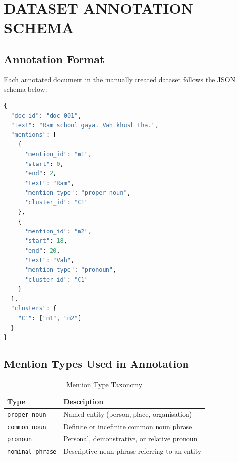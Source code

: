 \documentclass[12pt,a4paper]{report}
\begin{document}
\chapter{DATASET ANNOTATION SCHEMA}

\section{Annotation Format}

Each annotated document in the manually created dataset follows the JSON schema below:

\begin{lstlisting}[language=Python, caption={Dataset Annotation Schema}]
{
  "doc_id": "doc_001",
  "text": "Ram school gaya. Vah khush tha.",
  "mentions": [
    {
      "mention_id": "m1",
      "start": 0,
      "end": 2,
      "text": "Ram",
      "mention_type": "proper_noun",
      "cluster_id": "C1"
    },
    {
      "mention_id": "m2",
      "start": 18,
      "end": 20,
      "text": "Vah",
      "mention_type": "pronoun",
      "cluster_id": "C1"
    }
  ],
  "clusters": {
    "C1": ["m1", "m2"]
  }
}
\end{lstlisting}

\section{Mention Types Used in Annotation}

\begin{table}[H]
\centering
\caption{Mention Type Taxonomy}
\begin{tabular}{|l|p{9cm}|}
\hline
\textbf{Type} & \textbf{Description} \\
\hline
\texttt{proper\_noun} & Named entity (person, place, organisation) \\
\texttt{common\_noun} & Definite or indefinite common noun phrase \\
\texttt{pronoun} & Personal, demonstrative, or relative pronoun \\
\texttt{nominal\_phrase} & Descriptive noun phrase referring to an entity \\
\hline
\end{tabular}
\end{table}
\end{document}
